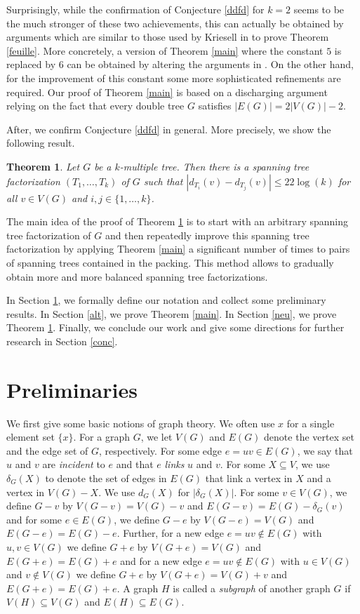 \documentclass{article}
\theoremstyle{plain}
\newtheorem{Theorem}{Theorem}
\theoremstyle{nonumberplain}
\theoremstyle{nonumberplain}
\newcommand{\stf}{spanning tree factorization }
\begin{document}
Surprisingly, while the confirmation of Conjecture \ref{ddfd} for $k=2$ seems to be the much stronger of these two achievements, this can actually be obtained by arguments which are similar to those used by Kriesell in \cite{nk1} to prove Theorem \ref{feuille}. More concretely, a version of Theorem \ref{main} where the constant $5$ is replaced by $6$ can be obtained by altering the arguments in \cite{nk1}. On the other hand, for the improvement of this constant some more sophisticated refinements are required. Our proof of Theorem \ref{main} is based on a discharging argument relying on the fact that every double tree $G$ satisfies $|E(G)|=2|V(G)|-2$. 
\medskip

After, we confirm Conjecture \ref{ddfd} in general. More precisely, we show the following result.

\begin{Theorem}\label{newmain}
Let $G$ be a $k$-multiple tree. Then there is a \stf $(T_1,\ldots,T_k)$ of $G$ such that $|d_{T_i}(v)-d_{T_j}(v)|\leq 22\log(k)$ for all $v \in V(G)$ and $i,j \in \{1,\ldots,k\}$.
\end{Theorem}

The main idea of the proof of Theorem \ref{newmain} is to start with an arbitrary \stf of $G$ and then repeatedly improve this \stf by applying Theorem \ref{main} a significant number of times to pairs of spanning trees contained in the packing. This method allows to gradually obtain more and more balanced spanning tree factorizations. 
\medskip

In Section \ref{prel}, we formally define our notation and collect some preliminary results. In Section \ref{alt}, we prove Theorem \ref{main}.  In Section \ref{neu}, we prove Theorem \ref{newmain}. Finally, we conclude our work and give some directions for further research in Section \ref{conc}.
\section{Preliminaries}\label{prel}

We first give some basic notions of graph theory. We often use $x$ for a single element set $\{x\}$. For a graph $G$, we let $V(G)$ and $E(G)$ denote the vertex set and the edge set of $G$, respectively. For some edge $e=uv \in E(G)$, we say that $u$ and $v$ are {\it incident} to $e$ and that $e$ {\it links} $u$ and $v$. For some $X \subseteq V$, we use $\delta_G(X)$ to denote the set of edges in $E(G)$ that link a vertex in $X$ and a vertex in $V(G)-X$. We use $d_G(X)$ for $|\delta_G(X)|$. For some $v \in V(G)$, we define $G-v$ by $V(G-v)=V(G)-v$ and $E(G-v)=E(G)-\delta_G(v)$ and for some $e \in E(G)$, we define $G-e$ by $V(G-e)=V(G)$ and $E(G-e)=E(G)-e$. Further, for a new edge $e=uv \notin E(G)$ with $u,v \in V(G)$ we define $G+e$ by $V(G+e)=V(G)$ and $E(G+e)=E(G)+e$ and for a new edge $e=uv \notin E(G)$ with $u \in V(G)$ and $v \notin V(G)$ we define $G+e$ by $V(G+e)=V(G)+v$ and $E(G+e)=E(G)+e$. A graph $H$ is called a {\it subgraph} of another graph $G$ if $V(H)\subseteq V(G)$ and $E(H)\subseteq E(G)$.
\end{document}
